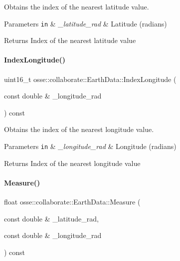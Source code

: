 Obtains the index of the nearest latitude value. 


\begin{DoxyParams}[1]{Parameters}
\mbox{\tt in}  & {\em \+\_\+latitude\+\_\+rad} & Latitude (radians) \\
\hline
\end{DoxyParams}
\begin{DoxyReturn}{Returns}
Index of the nearest latitude value 
\end{DoxyReturn}
\mbox{\label{classosse_1_1collaborate_1_1_earth_data_affbe14ade774253ba546982953996574}} 
\paragraph{\texorpdfstring{Index\+Longitude()}{IndexLongitude()}}
{\footnotesize\ttfamily uint16\+\_\+t osse\+::collaborate\+::\+Earth\+Data\+::\+Index\+Longitude (\begin{DoxyParamCaption}\item[{const double \&}]{\+\_\+longitude\+\_\+rad }\end{DoxyParamCaption}) const\hspace{0.3cm}{\ttfamily [private]}}



Obtains the index of the nearest longitude value. 


\begin{DoxyParams}[1]{Parameters}
\mbox{\tt in}  & {\em \+\_\+longitude\+\_\+rad} & Longitude (radians) \\
\hline
\end{DoxyParams}
\begin{DoxyReturn}{Returns}
Index of the nearest longitude value 
\end{DoxyReturn}
\mbox{\label{classosse_1_1collaborate_1_1_earth_data_a39c94ce236efd3ddb85e6108205a7067}} 
\paragraph{\texorpdfstring{Measure()}{Measure()}}
{\footnotesize\ttfamily float osse\+::collaborate\+::\+Earth\+Data\+::\+Measure (\begin{DoxyParamCaption}\item[{const double \&}]{\+\_\+latitude\+\_\+rad,  }\item[{const double \&}]{\+\_\+longitude\+\_\+rad }\end{DoxyParamCaption}) const}



